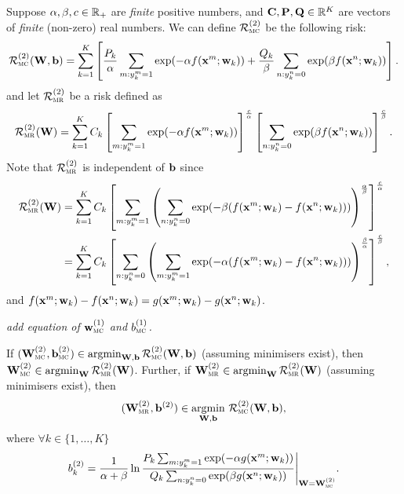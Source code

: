 Suppose $\alpha, \beta, c \in \mathbb{R}_+$ are \emph{finite} positive numbers, 
and $\mathbf{C}, \mathbf{P}, \mathbf{Q} \in \mathbb{R}^K$ are vectors of \emph{finite} (non-zero) real numbers.
We can define $\mathcal{R}_\textsc{mc}^{({2})}$ be the following risk:
\begin{equation}
\label{eq:mc2}
\displaystyle
\mathcal{R}_\textsc{mc}^{({2})}(\mathbf{W}, \mathbf{b}) 
= \sum_{k=1}^K \left[ 
  \frac{P_k}{\alpha} \sum_{m: y_k^m = 1} \exp(-\alpha f(\mathbf{x}^m; \mathbf{w}_k)) +
  \frac{Q_k}{\beta } \sum_{n: y_k^n = 0} \exp( \beta  f(\mathbf{x}^n; \mathbf{w}_k)) \right].
\end{equation}
and let $\mathcal{R}_\textsc{mr}^{({2})}$ be a risk defined as
\begin{equation}
\label{eq:mr2}
\displaystyle
\mathcal{R}_\textsc{mr}^{({2})}(\mathbf{W}) 
= \sum_{k=1}^K C_k
  \left[ \sum_{m: y_k^m = 1} \exp(-\alpha f(\mathbf{x}^m; \mathbf{w}_k)) \right]^\frac{c}{\alpha} 
  \left[ \sum_{n: y_k^n = 0} \exp( \beta  f(\mathbf{x}^n; \mathbf{w}_k)) \right]^\frac{c}{\beta}.
\end{equation}
Note that $\mathcal{R}_\textsc{mr}^{({2})}$ is independent of $\mathbf{b}$ since 
\begin{equation*}
\displaystyle
\begin{aligned}
\mathcal{R}_\textsc{mr}^{({2})}(\mathbf{W})
&= \sum_{k=1}^K C_k
   \left[ \sum_{m: y_k^m = 1} \left( \sum_{n: y_k^n = 0} 
   \exp(-\beta(f(\mathbf{x}^m; \mathbf{w}_k) - f(\mathbf{x}^n; \mathbf{w}_k))) \right)^\frac{\alpha}{\beta} \right]^\frac{c}{\alpha} \\
&= \sum_{k=1}^K C_k
   \left[ \sum_{n: y_k^n = 0} \left( \sum_{m: y_k^m = 1}
   \exp(-\alpha(f(\mathbf{x}^m; \mathbf{w}_k) - f(\mathbf{x}^n; \mathbf{w}_k))) \right)^\frac{\beta}{\alpha} \right]^\frac{c}{\beta},
\end{aligned}
\end{equation*}
and $f(\mathbf{x}^m; \mathbf{w}_k) - f(\mathbf{x}^n; \mathbf{w}_k) = g(\mathbf{x}^m; \mathbf{w}_k) - g(\mathbf{x}^n; \mathbf{w}_k)$.


\TODO
{\it add equation of $\mathbf{w}_\textsc{mc}^{({1})}$ and $b_\textsc{mc}^{({1})}$.}

\begin{theorem}
\label{theorem:mc2=mr2}
If $(\mathbf{W}_\textsc{mc}^{({2})}, \mathbf{b}_\textsc{mc}^{({2})}) \in \operatorname*{argmin}_{\mathbf{W},\mathbf{b}} \mathcal{R}_\textsc{mc}^{({2})}(\mathbf{W}, \mathbf{b})$ (assuming minimisers exist),
then $\mathbf{W}_\textsc{mc}^{({2})} \in \operatorname*{argmin}_{\mathbf{W}} \mathcal{R}_\textsc{mr}^{({2})}(\mathbf{W})$.
Further, if $\mathbf{W}_\textsc{mr}^{({2})} \in \operatorname*{argmin}_{\mathbf{W}} \mathcal{R}_\textsc{mr}^{({2})}(\mathbf{W})$ (assuming minimisers exist),
then 
$$
(\mathbf{W}_\textsc{mr}^{({2})}, \mathbf{b}^{({2})}) \in \operatorname*{argmin}_{\mathbf{W},\mathbf{b}} \, \mathcal{R}_\textsc{mc}^{({2})}(\mathbf{W}, \mathbf{b}),
$$ 
where $\forall k \in \{1,\dots,K\}$
$$
b_k^{({2})}
= \frac{1}{\alpha + \beta}
  \ln \frac{P_k \sum_{m: y_k^m = 1} \exp(-\alpha g(\mathbf{x}^m; \mathbf{w}_k))} {Q_k \sum_{n: y_k^n = 0} \exp( \beta g(\mathbf{x}^n; \mathbf{w}_k))}
  \Bigg|_{\mathbf{W} = \mathbf{W}_\textsc{mc}^{({2})}}.
$$
\end{theorem}



